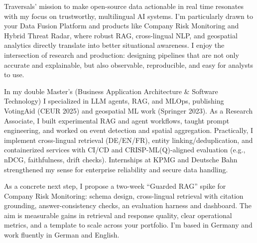 Traversals’ mission to make open-source data actionable in real time resonates with my focus on trustworthy, multilingual AI systems. I’m particularly drawn to your Data Fusion Platform and products like Company Risk Monitoring and Hybrid Threat Radar, where robust RAG, cross-lingual NLP, and geospatial analytics directly translate into better situational awareness. I enjoy the intersection of research and production: designing pipelines that are not only accurate and explainable, but also observable, reproducible, and easy for analysts to use.

In my double Master’s (Business Application Architecture & Software Technology) I specialized in LLM agents, RAG, and MLOps, publishing VotingAid (CEUR 2025) and geospatial ML work (Springer 2023). As a Research Associate, I built experimental RAG and agent workflows, taught prompt engineering, and worked on event detection and spatial aggregation. Practically, I implement cross-lingual retrieval (DE/EN/FR), entity linking/deduplication, and containerized services with CI/CD and CRISP-ML(Q)-aligned evaluation (e.g., nDCG, faithfulness, drift checks). Internships at KPMG and Deutsche Bahn strengthened my sense for enterprise reliability and secure data handling.

As a concrete next step, I propose a two-week “Guarded RAG” spike for Company Risk Monitoring: schema design, cross-lingual retrieval with citation grounding, answer-consistency checks, an evaluation harness and dashboard. The aim is measurable gains in retrieval and response quality, clear operational metrics, and a template to scale across your portfolio. I’m based in Germany and work fluently in German and English.